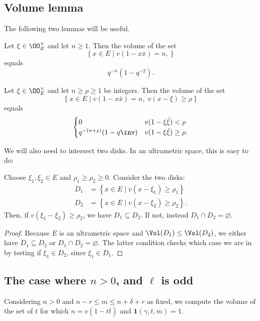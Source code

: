 \subsection{Volume lemma}
The following two lemmas will be useful.
\begin{lemma}
  Let $\xi \in \OO_E^\times$ and let $n \ge 1$.
  Then the volume of the set
  \[ \left\{ x \in E \mid v(1-x \bar x) = n, \right\} \]
  equals
  \[ q^{-n}(1-q^{-2}). \]
\end{lemma}

\begin{lemma}
  Let $\xi \in \OO_E^\times$ and let $n \ge \rho \ge 1$ be integers.
  Then the volume of the set
  \[ \left\{ x \in E \mid v(1-x \bar x) = n, \; v(x-\xi) \ge \rho \right\} \]
  equals
  \[
    \begin{cases}
      0 & v(1-\xi\bar\xi) < \rho \\
      q^{-(n+\rho)}(1-q\inv) & v(1-\xi\bar\xi) \ge \rho.
    \end{cases}
  \]
  \label{lem:volume}
\end{lemma}

We will also need to intersect two disks. In an ultrametric space, this is easy to do:
\begin{lemma}
  Choose $\xi_1, \xi_2 \in E$ and $\rho_1 \geq \rho_2 \geq 0$.
  Consider the two disks:
  \begin{align*}
    D_1 &= \left\{ x \in E \mid v(x-\xi_1) \ge \rho_1 \right\} \\
    D_2 &= \left\{ x \in E \mid v(x-\xi_2) \ge \rho_2 \right\}.
  \end{align*}
  Then, if $v(\xi_1-\xi_2) \geq \rho_2$, we have $D_1 \subseteq D_2$.
  If not, instead $D_1 \cap D_2 = \varnothing$.
  \label{lem:mastercard}
\end{lemma}
\begin{proof}
  Because $E$ is an ultrametric space and $\Vol(D_1) \leq \Vol(D_2)$,
  we either have $D_1 \subseteq D_2$ or $D_1 \cap D_2 = \varnothing$.
  The latter condition checks which case we are in by testing if $\xi_1 \in D_2$,
  since $\xi_1 \in D_1$.
\end{proof}

\subsection{The case where $n > 0$, and $\ell$ is odd}
Considering $n > 0$ and $n-r \le m \le n+\delta+r$ as fixed,
we compute the volume of the set of $t$
for which $n = v(1-t\bar t)$ and $\mathbf{1}(\gamma,t,m) = 1$.

